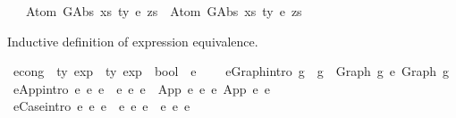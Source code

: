 \begin{isabellebody}
\ \ \ Atom\ {\isacharparenleft}{\kern0pt}GAbs\ xs\ ty\ e{}{\isacharparenright}{\kern0pt}\ zs\ {\isasymsimeq}\ Atom\ {\isacharparenleft}{\kern0pt}GAbs\ xs\ ty\ e{}{\isacharparenright}{\kern0pt}\ zs{\isachardoublequoteclose}%
\begin{isamarkuptext}%
Inductive definition of expression equivalence.%
\end{isamarkuptext}\isamarkuptrue%
\isamarkupfalse%
\ econg\ {\isacharcolon}{\kern0pt}{\isacharcolon}{\kern0pt}\ {\isachardoublequoteopen}{\isacharprime}{\kern0pt}ty\ exp\ {\isacharequal}{\kern0pt}{\isachargreater}{\kern0pt}\ {\isacharprime}{\kern0pt}ty\ exp\ {\isacharequal}{\kern0pt}{\isachargreater}{\kern0pt}\ bool{\isachardoublequoteclose}\ {\isacharparenleft}{\kern0pt}\ {\isachardoublequoteopen}{\isasymsimeq}e{\isachardoublequoteclose}\ {}{}{\isacharparenright}{\kern0pt}\ \isanewline
\ \ e{\isacharunderscore}{\kern0pt}Graph{\isacharbrackleft}{\kern0pt}intro{\isacharbrackright}{\kern0pt}{\isacharcolon}{\kern0pt}\ {\isachardoublequoteopen}g\ {\isasymsimeq}\ g{\isacharprime}{\kern0pt}\ {\isacharequal}{\kern0pt}{\isacharequal}{\kern0pt}{\isachargreater}{\kern0pt}\ Graph\ g\ {\isasymsimeq}e\ Graph\ g{\isacharprime}{\kern0pt}{\isachardoublequoteclose}\isanewline
{\isacharbar}{\kern0pt}\ e{\isacharunderscore}{\kern0pt}App{\isacharbrackleft}{\kern0pt}intro{\isacharbrackright}{\kern0pt}{\isacharcolon}{\kern0pt}\ {\isachardoublequoteopen}e{}\ {\isasymsimeq}e\ e{}{\isacharprime}{\kern0pt}\ {\isacharequal}{\kern0pt}{\isacharequal}{\kern0pt}{\isachargreater}{\kern0pt}\ e{}\ {\isasymsimeq}e\ e{}{\isacharprime}{\kern0pt}\ {\isacharequal}{\kern0pt}{\isacharequal}{\kern0pt}{\isachargreater}{\kern0pt}\ App\ e{}\ e{}\ {\isasymsimeq}e\ App\ e{}{\isacharprime}{\kern0pt}\ e{}{\isacharprime}{\kern0pt}{\isachardoublequoteclose}\isanewline
{\isacharbar}{\kern0pt}\ e{\isacharunderscore}{\kern0pt}Case{\isacharbrackleft}{\kern0pt}intro{\isacharbrackright}{\kern0pt}{\isacharcolon}{\kern0pt}\ {\isachardoublequoteopen}e{}\ {\isasymsimeq}e\ e{}{\isacharprime}{\kern0pt}\ {\isacharequal}{\kern0pt}{\isacharequal}{\kern0pt}{\isachargreater}{\kern0pt}\ e{}\ {\isasymsimeq}e\ e{}{\isacharprime}{\kern0pt}\ {\isacharequal}{\kern0pt}{\isacharequal}{\kern0pt}{\isachargreater}{\kern0pt}\ e{}\ {\isasymsimeq}e\ e{}{\isacharprime}{\kern0pt}\ {\isacharequal}{\kern0pt}{\isacharequal}{\kern0pt}{\isachargreater}{\kern0pt}\isanewline

\end{isabellebody}
